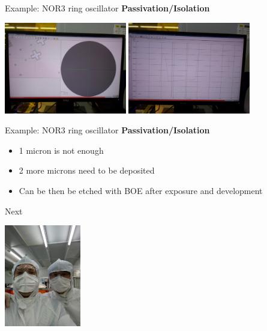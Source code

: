 \documentclass[aspectratio=169]{beamer}
\begin{document}
\begin{frame}{Example: NOR3 ring oscillator}
	\textbf{Passivation/Isolation}

	\begin{center}
		\includegraphics[width=0.4\textwidth]{images/20181220_124600.jpg}
		\includegraphics[width=0.4\textwidth]{images/20181220_124638_Burst01.jpg}
	\end{center}
\end{frame}

\begin{frame}{Example: NOR3 ring oscillator}
	\textbf{Passivation/Isolation}

	\begin{itemize}
		\item 1 micron is not enough
		\item 2 more microns need to be deposited
		\item Can be then be etched with BOE after exposure and development
	\end{itemize}
\end{frame}

\begin{frame}{Next}
	\begin{center}
		\includegraphics[width=0.25\textwidth]{images/20181210_161139.jpg}
	\end{center}
\end{frame}
\end{document}
